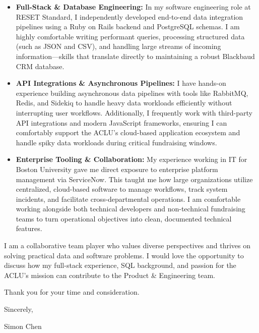 \documentclass[letterpaper,11pt]{article}
\begin{document}
\begin{itemize}[leftmargin=*,noitemsep,topsep=4pt]
    \item \textbf{Full-Stack \& Database Engineering:} In my software engineering role at RESET Standard, I independently developed end-to-end data integration pipelines using a Ruby on Rails backend and PostgreSQL schemas. I am highly comfortable writing performant queries, processing structured data (such as JSON and CSV), and handling large streams of incoming information—skills that translate directly to maintaining a robust Blackbaud CRM database.
    \item \textbf{API Integrations \& Asynchronous Pipelines:} I have hands-on experience building asynchronous data pipelines with tools like RabbitMQ, Redis, and Sidekiq to handle heavy data workloads efficiently without interrupting user workflows. Additionally, I frequently work with third-party API integrations and modern JavaScript frameworks, ensuring I can comfortably support the ACLU’s cloud-based application ecosystem and handle spiky data workloads during critical fundraising windows.
    \item \textbf{Enterprise Tooling \& Collaboration:} My experience working in IT for Boston University gave me direct exposure to enterprise platform management via ServiceNow. This taught me how large organizations utilize centralized, cloud-based software to manage workflows, track system incidents, and facilitate cross-departmental operations. I am comfortable working alongside both technical developers and non-technical fundraising teams to turn operational objectives into clean, documented technical features.
\end{itemize}

I am a collaborative team player who values diverse perspectives and thrives on solving practical data and software problems. I would love the opportunity to discuss how my full-stack experience, SQL background, and passion for the ACLU's mission can contribute to the Product \& Engineering team.

Thank you for your time and consideration.

\vspace{10pt}
Sincerely,

\vspace{20pt}
Simon Chen
\end{document}
